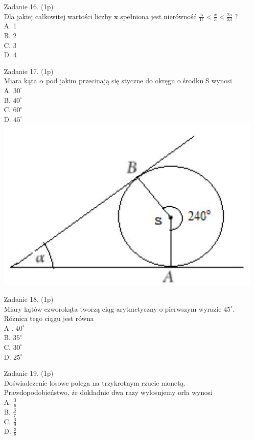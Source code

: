 \documentclass[10pt]{article}
\begin{document}
Zadanie 16. (1p)\\
Dla jakiej całkowitej wartości liczby \(\boldsymbol{x}\) spełniona jest nierówność \(\frac{5}{11}<\frac{x}{3}<\frac{25}{33}\) ?\\
A. 1\\
B. 2\\
C. 3\\
D. 4

Zadanie 17. (1p)\\
Miara kąta \(\alpha\) pod jakim przecinają się styczne do okręgu o środku S wynosi\\
A. \(30^{\circ}\)\\
B. \(40^{\circ}\)\\
C. \(60^{\circ}\)\\
D. \(45^{\circ}\)\\
\includegraphics[max width=\textwidth, center]{2024_11_21_0213a2175f3206eefc55g-06}

Zadanie 18. (1p)\\
Miary kątów czworokąta tworzą ciąg arytmetyczny o pierwszym wyrazie \(45^{\circ}\). Różnica tego ciągu jest równa\\
A . \(40^{\circ}\)\\
B. \(35^{\circ}\)\\
C. \(30^{\circ}\)\\
D. \(25^{\circ}\)

Zadanie 19. (1p)\\
Doświadczenie losowe polega na trzykrotnym rzucie monetą. Prawdopodobieństwo, że dokładnie dwa razy wylosujemy orła wynosi\\
A. \(\frac{3}{6}\)\\
B. \(\frac{3}{7}\)\\
C. \(\frac{3}{9}\)\\
D. \(\frac{3}{8}\)
\end{document}
